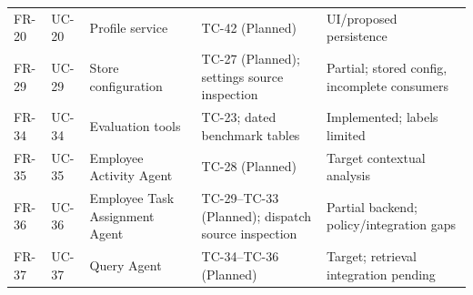 \begin{longtable}{P{0.08\textwidth}P{0.09\textwidth}P{0.23\textwidth}P{0.25\textwidth}P{0.25\textwidth}}
FR-20 & UC-20 & Profile service & TC-42 (Planned) & UI/proposed persistence\\
FR-29 & UC-29 & Store configuration & TC-27 (Planned); settings source inspection & Partial; stored config, incomplete consumers\\
FR-34 & UC-34 & Evaluation tools & TC-23; dated benchmark tables & Implemented; labels limited\\
FR-35 & UC-35 & Employee Activity Agent & TC-28 (Planned) & Target contextual analysis\\
FR-36 & UC-36 & Employee Task Assignment Agent & TC-29--TC-33 (Planned); dispatch source inspection & Partial backend; policy/integration gaps\\
FR-37 & UC-37 & Query Agent & TC-34--TC-36 (Planned) & Target; retrieval integration pending\\
\bottomrule
\end{longtable}
